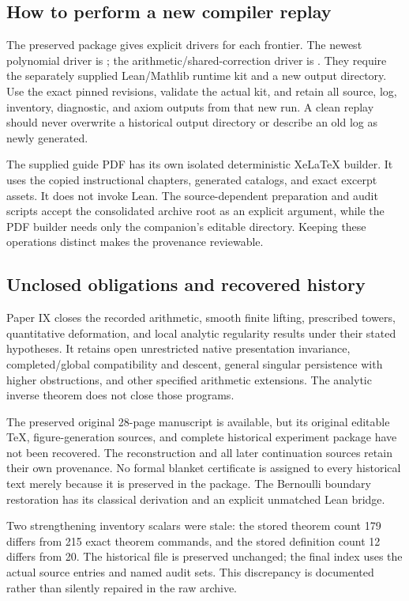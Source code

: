 \subsection{How to perform a new compiler replay}
The preserved package gives explicit drivers for each frontier. The newest polynomial driver is ; the arithmetic/shared-correction driver is . They require the separately supplied Lean/Mathlib runtime kit and a new output directory. Use the exact pinned revisions, validate the actual kit, and retain all source, log, inventory, diagnostic, and axiom outputs from that new run. A clean replay should never overwrite a historical output directory or describe an old log as newly generated.

The supplied guide PDF has its own isolated deterministic XeLaTeX builder. It uses the copied instructional chapters, generated catalogs, and exact excerpt assets. It does not invoke Lean. The source-dependent preparation and audit scripts accept the consolidated archive root as an explicit argument, while the PDF builder needs only the companion's editable directory. Keeping these operations distinct makes the provenance reviewable.

\subsection{Unclosed obligations and recovered history}
Paper IX closes the recorded arithmetic, smooth finite lifting, prescribed towers, quantitative deformation, and local analytic regularity results under their stated hypotheses. It retains open unrestricted native presentation invariance, completed/global compatibility and descent, general singular persistence with higher obstructions, and other specified arithmetic extensions. The analytic inverse theorem does not close those programs.

The preserved original 28-page manuscript is available, but its original editable TeX, figure-generation sources, and complete historical experiment package have not been recovered. The reconstruction and all later continuation sources retain their own provenance. No formal blanket certificate is assigned to every historical text merely because it is preserved in the package. The Bernoulli boundary restoration has its classical derivation and an explicit unmatched Lean bridge.

Two strengthening inventory scalars were stale: the stored theorem count 179 differs from 215 exact theorem commands, and the stored definition count 12 differs from 20. The historical file is preserved unchanged; the final index uses the actual source entries and named audit sets. This discrepancy is documented rather than silently repaired in the raw archive.
